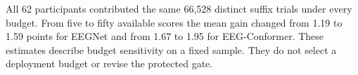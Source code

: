 All 62 participants contributed the same 66,528 distinct suffix trials under every budget. From five to fifty available scores the mean gain changed from 1.19 to 1.59 points for EEGNet and from 1.67 to 1.95 for EEG-Conformer. These estimates describe budget sensitivity on a fixed sample. They do not select a deployment budget or revise the protected gate.
